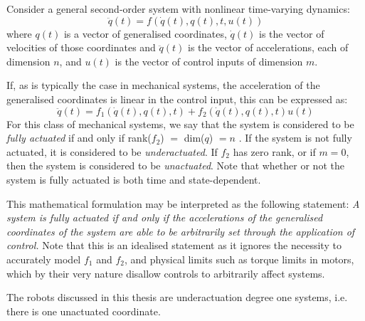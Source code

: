 Consider a general second-order system with nonlinear time-varying dynamics:
\[ \ddot{q}(t) = f\left(\dot{q}(t), q(t), t, u(t)\right) \]
where $q(t)$ is a vector of generalised coordinates, $\dot{q}(t)$ is the vector of velocities of those coordinates and $\ddot{q}(t)$ is the vector of accelerations, each of dimension $n$, and $u(t)$ is the vector of control inputs of dimension $m$. 

If, as is typically the case in mechanical systems, the acceleration of the generalised coordinates is linear in the control input, this can be expressed as:
\[ \ddot{q}(t) = f_1\left(\dot{q}(t), q(t), t\right) + f_2\left(\dot{q}(t), q(t), t\right)u(t) \]
For this class of mechanical systems, we say that the system is considered to be \textit{fully actuated} if and only if rank($f_2$) $=$ dim($q$) $= n$ \cite{tedrake2009opencourseware}. If the system is not fully actuated, it is considered to be \textit{underactuated}. If $f_2$ has zero rank, or if $m=0$, then the system is considered to be \textit{unactuated}. Note that whether or not the system is fully actuated is both time and state-dependent.  

This mathematical formulation may be interpreted as the following statement:
\textit{A system is fully actuated if and only if the accelerations of the generalised coordinates of the system are able to be arbitrarily set through the application of control.} Note that this is an idealised statement as it ignores the necessity to accurately model $f_1$ and $f_2$, and physical limits such as torque limits in motors, which by their very nature disallow controls to arbitrarily affect systems. 

The robots discussed in this thesis are underactuation degree one systems, i.e. there is one unactuated coordinate.